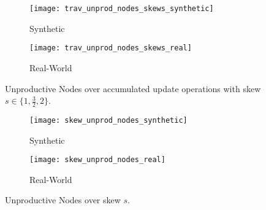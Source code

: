 \documentclass[abstracton,12pt]{scrartcl}
\theoremstyle{definition}
\begin{document}

\begin{figure}[h]
  \centering
  \begin{subfigure}{0.49\linewidth}
    \centering
    \caption{Synthetic}
    \texttt{[image: trav\_unprod\_nodes\_skews\_synthetic]}
    \label{fig:trav_unprod_nodes_skews_synthetic}
  \end{subfigure}
  \begin{subfigure}{0.49\linewidth}
    \centering
    \caption{Real-World}
    \texttt{[image: trav\_unprod\_nodes\_skews\_real]}
    \label{fig:trav_unprod_nodes_skews_real}
  \end{subfigure}
  \vspace{-0.65cm}
  \caption[Unproductive Nodes over update operations with skew $s \in \{
  1, \frac{3}{2}, 2\}$]{
      Unproductive Nodes over accumulated update operations with skew $s \in \{
  1, \frac{3}{2}, 2\}$.}
\end{figure}

\begin{figure}[h]
  \centering
  \begin{subfigure}{0.49\linewidth}
    \centering
    \caption{Synthetic}
    \texttt{[image: skew\_unprod\_nodes\_synthetic]}
    \label{fig:skew_unprod_nodes_synthetic}
  \end{subfigure}
  \begin{subfigure}{0.49\linewidth}
    \centering
    \caption{Real-World}
    \texttt{[image: skew\_unprod\_nodes\_real]}
    \label{fig:skew_unprod_nodes_real}
  \end{subfigure}
  \vspace{-0.65cm}
  \caption[Unproductive Nodes over skew $s$]{Unproductive Nodes over skew $s$.}
\end{figure}
\end{document}
